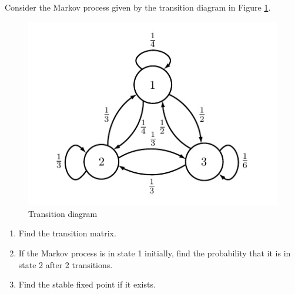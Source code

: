 \begin{problem}
Consider the Markov process given by the transition diagram in Figure \ref{fig:markov2}.
\begin{figure}[H]
\includegraphics[width=\textwidth]{markov2}
\caption{Transition diagram}
\label{fig:markov2}
\end{figure}

\begin{enumerate}
\item Find the transition matrix.
\item If the Markov process is in state 1 initially, find the probability that it is in state 2 after 2 transitions.
\item Find the stable fixed point if it exists.
\end{enumerate}
\end{problem}